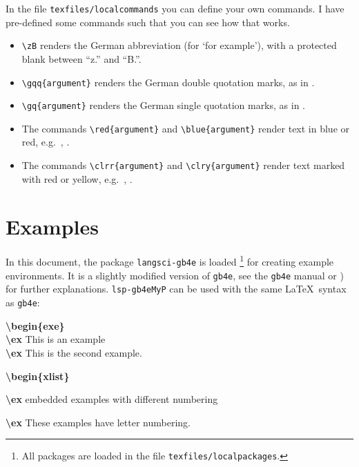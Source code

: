In the file \texttt{texfiles/localcommands} you can define your own commands. I have pre-defined some commands such that you can see how that works.

\begin{itemize}
	\item \verb|\zB| renders the German abbreviation \zB (for `for example'), with a protected blank between ``z.'' and ``B.''.
	
	\item \verb||  renders the German double quotation marks, as in \gqq{argument}.
	
	\item \verb||  renders the German single quotation marks, as in \gq{argument}.
	
	\item The commands \verb|\red{argument}| and \verb|\blue{argument}| render text in blue or red, e.g.\ , .
	
	\item The commands \verb|\clrr{argument}| and \verb|\clry{argument}| render text marked with red  or yellow, e.g.\ , .
\end{itemize}


\section{Examples}
\label{ch:Examples}


In this document, the package \texttt{langsci-gb4e} is loaded%
	\footnote{All packages are loaded in the file \texttt{texfiles/localpackages}.} %
for creating example environments.
It is a slightly modified version of \texttt{gb4e}, see the \texttt{gb4e} manual \citep{Kolb&Co10a} or \citet{Freitag&MyP15a}) for further explanations.
\texttt{lsp-gb4eMyP} can be used with the same \LaTeX \ syntax as \texttt{gb4e}:

\smallskip
\noindent
\textbf{\textbackslash begin\{exe\}}\\
\textbf{\textbackslash ex} This is an example\\
\textbf{\textbackslash ex} This is the second example.

\textbf{\textbackslash begin\{xlist\}}

\textbf{\textbackslash ex} embedded examples with different numbering

\textbf{\textbackslash ex} These examples have letter numbering.


